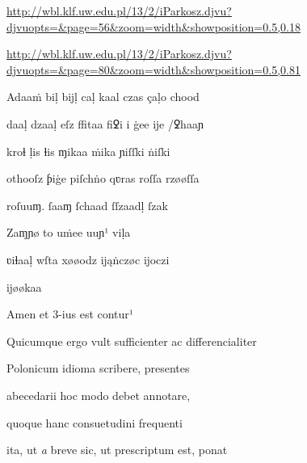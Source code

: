 
\newParkoszpage

{
\url{http://wbl.klf.uw.edu.pl/13/2/iParkosz.djvu?djvuopts=&page=56&zoom=width&showposition=0.5,0.18}

\url{http://wbl.klf.uw.edu.pl/13/2/iParkosz.djvu?djvuopts=&page=80&zoom=width&showposition=0.5,0.81}
}

\bigskip

\obeylines
\mono

\fulllines









\fulllines

\Quivira

Adaaṁ biḷ bĳḷ caḷ kaal czas çaḷo chood 

daaḷ dzaaḷ eſz ﬀitaa fiꝿi i ġee ĳe /ꝿhaaɲ 

kroɬ ḷis ɬis ɱikaa ṁika ɲiſſki ṅiſki 

othooſz ƥiġe piſchṅo qʋras roſſa rzøøſſa 

roſuuɱ. ſaaɱ ſchaad ſſzaadḷ ſzak 

 Zaɱɲø to uṁee uuɲ¹ viḷa 

ʋiɬaaḷ wſta xøøodz ĳąṅczøc ĳoczi

ĳøøkaa

Amen et 3-ius est contur¹

Quicumque ergo vult sufficienter ac differencialiter

Polonicum idioma scribere, presentes 

 abecedarii hoc modo debet annotare, 

 quoque hanc consuetudini frequenti 

 ita, ut \textit{a} breve sic, ut prescriptum est, ponat 

